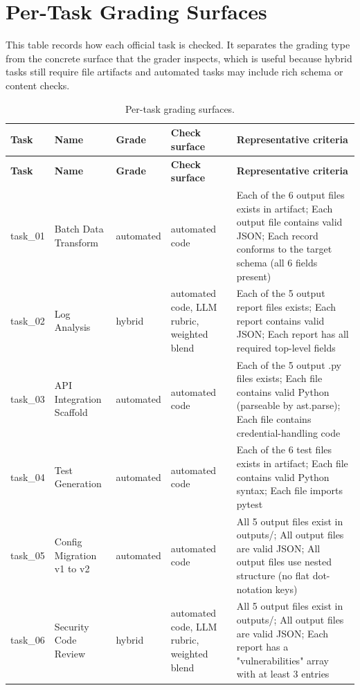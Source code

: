 \documentclass[11pt]{article}
\begin{document}
\section{Per-Task Grading Surfaces}
\label{app:task-grading-surfaces}
This table records how each official task is checked. It separates the grading type from the concrete surface that the grader inspects, which is useful because hybrid tasks still require file artifacts and automated tasks may include rich schema or content checks.
\begingroup
\footnotesize
\setlength{\tabcolsep}{3pt}
\begin{longtable}{L{0.07\textwidth}L{0.21\textwidth}L{0.11\textwidth}L{0.16\textwidth}L{0.38\textwidth}}
\caption{Per-task grading surfaces.}\label{tab:task-grading-surfaces}\\
\toprule
\textbf{Task} & \textbf{Name} & \textbf{Grade} & \textbf{Check surface} & \textbf{Representative criteria} \\
\midrule
\endfirsthead
\toprule
\textbf{Task} & \textbf{Name} & \textbf{Grade} & \textbf{Check surface} & \textbf{Representative criteria} \\
\midrule
\endhead
task\_01 & Batch Data Transform & automated & automated code & Each of the 6 output files exists in artifact; Each output file contains valid JSON; Each record conforms to the target schema (all 6 fields present) \\
task\_02 & Log Analysis & hybrid & automated code, LLM rubric, weighted blend & Each of the 5 output report files exists; Each report contains valid JSON; Each report has all required top-level fields \\
task\_03 & API Integration Scaffold & automated & automated code & Each of the 5 output .py files exists; Each file contains valid Python (parseable by ast.parse); Each file contains credential-handling code \\
task\_04 & Test Generation & automated & automated code & Each of the 6 test files exists in artifact; Each file contains valid Python syntax; Each file imports pytest \\
task\_05 & Config Migration v1 to v2 & automated & automated code & All 5 output files exist in outputs/; All output files are valid JSON; All output files use nested structure (no flat dot-notation keys) \\
task\_06 & Security Code Review & hybrid & automated code, LLM rubric, weighted blend & All 5 output files exist in outputs/; All output files are valid JSON; Each report has a "vulnerabilities" array with at least 3 entries \\

\end{longtable}
\end{document}
